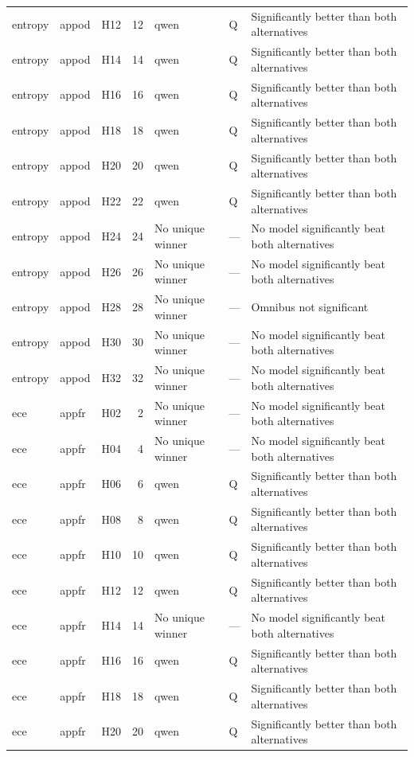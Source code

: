 \begin{longtable}{lllrlll}
entropy & appod & H12 & 12 & qwen & Q & Significantly better than both alternatives \\
entropy & appod & H14 & 14 & qwen & Q & Significantly better than both alternatives \\
entropy & appod & H16 & 16 & qwen & Q & Significantly better than both alternatives \\
entropy & appod & H18 & 18 & qwen & Q & Significantly better than both alternatives \\
entropy & appod & H20 & 20 & qwen & Q & Significantly better than both alternatives \\
entropy & appod & H22 & 22 & qwen & Q & Significantly better than both alternatives \\
entropy & appod & H24 & 24 & No unique winner & — & No model significantly beat both alternatives \\
entropy & appod & H26 & 26 & No unique winner & — & No model significantly beat both alternatives \\
entropy & appod & H28 & 28 & No unique winner & — & Omnibus not significant \\
entropy & appod & H30 & 30 & No unique winner & — & No model significantly beat both alternatives \\
entropy & appod & H32 & 32 & No unique winner & — & No model significantly beat both alternatives \\
ece & appfr & H02 & 2 & No unique winner & — & No model significantly beat both alternatives \\
ece & appfr & H04 & 4 & No unique winner & — & No model significantly beat both alternatives \\
ece & appfr & H06 & 6 & qwen & Q & Significantly better than both alternatives \\
ece & appfr & H08 & 8 & qwen & Q & Significantly better than both alternatives \\
ece & appfr & H10 & 10 & qwen & Q & Significantly better than both alternatives \\
ece & appfr & H12 & 12 & qwen & Q & Significantly better than both alternatives \\
ece & appfr & H14 & 14 & No unique winner & — & No model significantly beat both alternatives \\
ece & appfr & H16 & 16 & qwen & Q & Significantly better than both alternatives \\
ece & appfr & H18 & 18 & qwen & Q & Significantly better than both alternatives \\
ece & appfr & H20 & 20 & qwen & Q & Significantly better than both alternatives \\

\end{longtable}
